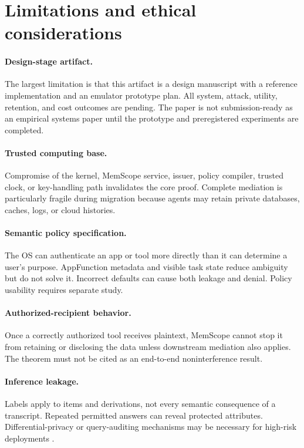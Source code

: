 \section{Limitations and ethical considerations}
\label{sec:limitations}

\paragraph{Design-stage artifact.}
The largest limitation is that this artifact is a design manuscript with a reference implementation and an emulator prototype plan. All system, attack, utility, retention, and cost outcomes are pending. The paper is not submission-ready as an empirical systems paper until the prototype and preregistered experiments are completed.

\paragraph{Trusted computing base.}
Compromise of the kernel, MemScope service, issuer, policy compiler, trusted clock, or key-handling path invalidates the core proof. Complete mediation is particularly fragile during migration because agents may retain private databases, caches, logs, or cloud histories.

\paragraph{Semantic policy specification.}
The OS can authenticate an app or tool more directly than it can determine a user's purpose. AppFunction metadata and visible task state reduce ambiguity but do not solve it. Incorrect defaults can cause both leakage and denial. Policy usability requires separate study.

\paragraph{Authorized-recipient behavior.}
Once a correctly authorized tool receives plaintext, MemScope cannot stop it from retaining or disclosing the data unless downstream mediation also applies. The theorem must not be cited as an end-to-end noninterference result.

\paragraph{Inference leakage.}
Labels apply to items and derivations, not every semantic consequence of a transcript. Repeated permitted answers can reveal protected attributes. Differential-privacy or query-auditing mechanisms may be necessary for high-risk deployments \citep{kim2026dpmemview,dwork2014algorithmic}.

